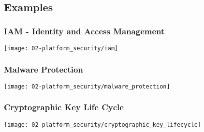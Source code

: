 \subsection{Examples}

\subsubsection{IAM - Identity and Access Management}
\begin{center}
    \vspace{-8pt}
    \texttt{[image: 02-platform\_security/iam]}
    \vspace{-8pt}
\end{center}

\subsubsection{Malware Protection}
\begin{center}
    \vspace{-8pt}
    \texttt{[image: 02-platform\_security/malware\_protection]}
    \vspace{-8pt}
\end{center}

\subsubsection{Cryptographic Key Life Cycle}
\begin{center}
    \vspace{-8pt}
    \texttt{[image: 02-platform\_security/cryptographic\_key\_lifecycle]}
    \vspace{-8pt}
\end{center}



